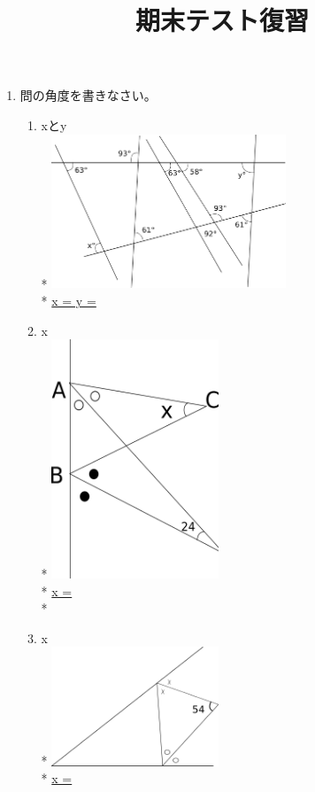 \documentclass[dvipdfmx]{jsarticle}
\begin{document}
\title{期末テスト復習}
\begin{enumerate}
  \item 問の角度を書きなさい。 
    \begin{enumerate}
      \item xとy 
        \vspace{0.2in} \\*
        \includegraphics[width=7cm]{g4750.png}
        \vspace{0.2in} \\*
        \underline{x =   \hspace{0.8in} y =   }
        \vspace{0.2in}
      \item x \\*
        \includegraphics[width=5cm]{s12.png}
        \vspace{0.2in} \\*
        \underline{x = }
        \vspace{0.2in} \\*
        \newpage
      \item x
        \vspace{0.2in} \\*
        \includegraphics[width=5cm]{g3877.png}
        \vspace{0.2in} \\*
        \underline{x = }


\end{enumerate}
\end{enumerate}
\end{document}
